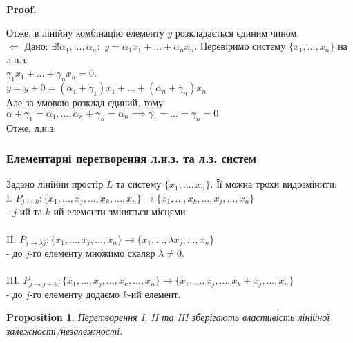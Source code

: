 \documentclass[a4paper, 10pt]{article}
\makeatletter
\def\leftproof{$\boxed{\Leftarrow}$ }
\theoremstyle{theoremdd}
\newtheorem{proposition}[theorem]{Proposition}
\renewenvironment{proof}[1][Proof.\\]{\par
\pushQED{\hfill \qed}%
\normalfont \topsep6\p@\@plus6\p@\relax
\trivlist
\item\relax
{\bfseries
#1\@addpunct{.}}\hspace\labelsep\ignorespaces
}{%
\popQED\endtrivlist\@endpefalse
}
\makeatother
\begin{document}
\begin{proof}
	Отже, в лінійну комбінацію елементу $y$ розкладається єдиним чином.
	\bigskip \\
	\leftproof Дано: $\exists! \alpha_1, \dots, \alpha_n:$
	$y = \alpha_1 x_1 + \dots + \alpha_n x_n$. Перевіримо систему $\{x_1, \dots, x_n\}$ на л.н.з.\\
	$\gamma_1 x_1 + \dots + \gamma_n x_n = 0$.\\
	$y = y + 0 = (\alpha_1 + \gamma_1)x_1 + \dots + (\alpha_n + \gamma_n)x_n$\\
	Але за умовою розклад єдиний, тому $\alpha + \gamma_1 = \alpha_1, \dots, \alpha_n + \gamma_n = \alpha_n \implies \gamma_1 = \dots = \gamma_n = 0$\\
	Отже, л.н.з.
	\end{proof}
	
	\subsubsection*{Елементарні перетворення л.н.з. та л.з. систем}
	Задано лінійни простір $L$ та систему $\{x_1, \dots, x_n\}$. Її можна трохи видозмінити:\\
	I. $P_{j \leftrightarrow k}: \{x_1, \dots, x_j, \dots, x_k, \dots, x_n\} \rightarrow \{x_1, \dots, x_k, \dots, x_j, \dots, x_n\}$ \\ - $j$-ий та $k$-ий елементи зміняться місцями.\\
	\\
	II. $P_{j \to \lambda j}: \{x_1, \dots, x_j, \dots, x_n\} \rightarrow \{x_1, \dots, \lambda x_j, \dots, x_n\}$ \\ - до $j$-го елементу множимо скаляр $\lambda \neq 0$.\\
	\\
	III. $P_{j \to j+k}: \{x_1, \dots, x_j, \dots, x_k, \dots, x_n\} \rightarrow \{x_1, \dots, x_j, \dots,  x_k + x_j, \dots, x_n\}$ \\ - до $j$-го елементу додаємо $k$-ий елемент.
	
	\begin{proposition}
	Перетворення I, II та III зберігають властивість лінійної залежності/незалежності.
	\end{proposition}
	
\end{document}
